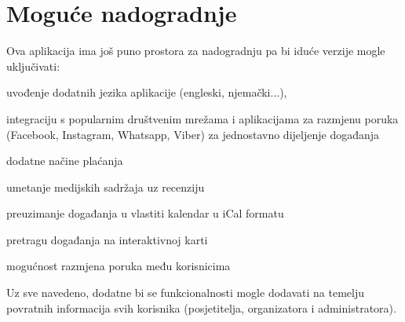 		\newpage
		
		\section{Moguće nadogradnje}
		
		Ova aplikacija ima još puno prostora za nadogradnju pa bi iduće verzije mogle uključivati:
			
			\begin{packed_enum}
				\item uvođenje dodatnih jezika aplikacije (engleski, njemački...),
				\item integraciju s popularnim društvenim mrežama i aplikacijama za razmjenu poruka (Facebook, Instagram, Whatsapp, Viber) za jednostavno dijeljenje događanja
				\item dodatne načine plaćanja
				\item umetanje medijskih sadržaja uz recenziju
				\item preuzimanje događanja u vlastiti kalendar u iCal formatu
				\item pretragu događanja na interaktivnoj karti
				\item mogućnost razmjena poruka među korisnicima
			\end{packed_enum}
			
		Uz sve navedeno, dodatne bi se funkcionalnosti mogle dodavati na temelju povratnih informacija svih korisnika (posjetitelja, organizatora i administratora).
		
		\eject
		
	